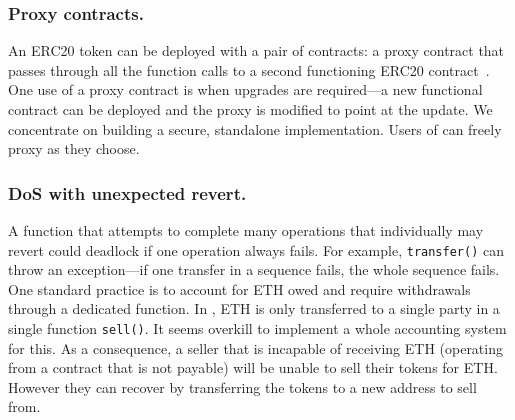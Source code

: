 \subsubsection{Proxy contracts.}

An ERC20 token can be deployed with a pair of contracts: a proxy contract that passes through all the function calls to a second functioning ERC20 contract~\cite{ProxyContract,ProxyPatterns}. One use of a proxy contract is when upgrades are required---a new functional contract can be deployed and the proxy is modified to point at the update. We concentrate on building a secure, standalone implementation. Users of \sys can freely proxy \sys as they choose. 

\subsubsection{DoS with unexpected revert.}

A function that attempts to complete many operations that individually may revert could deadlock if one operation always fails. For example, \texttt{transfer()} can throw an exception---if one transfer in a sequence fails, the whole sequence fails. One standard practice is to account for ETH owed and require withdrawals through a dedicated function. In \sys, ETH is only transferred to a single party in a single function \texttt{sell()}. It seems overkill to implement a whole accounting system for this. As a consequence, a seller that is incapable of receiving ETH (\eg operating from a contract that is not payable) will be unable to sell their tokens for ETH. However they can recover by transferring the tokens to a new address to sell from. 


